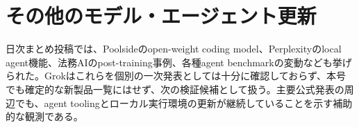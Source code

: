 \section{その他のモデル・エージェント更新}
日次まとめ投稿では、Poolsideのopen-weight coding model、Perplexityのlocal agent機能、法務AIのpost-training事例、各種agent benchmarkの変動なども挙げられた。Grokはこれらを個別の一次発表としては十分に確認しておらず、本号でも確定的な新製品一覧にはせず、次の検証候補として扱う。主要公式発表の周辺でも、agent toolingとローカル実行環境の更新が継続していることを示す補助的な観測である。
